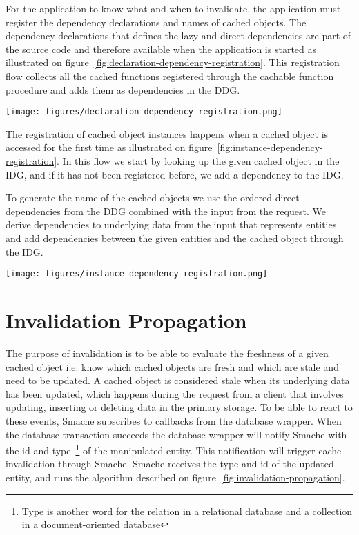 For the application to know what and when to invalidate, the application must register the dependency declarations and names of cached objects. The dependency declarations that defines the lazy and direct dependencies are part of the source code and therefore available when the application is started as illustrated on figure~\ref{fig:declaration-dependency-registration}. This registration flow collects all the cached functions registered through the cachable function procedure and adds them as dependencies in the DDG.

\begin{figure*}[ht!]
  \centering
  \texttt{[image: figures/declaration-dependency-registration.png]}
  \caption{The flow in which lazy and direct dependencies are registered from the declarations}
  \label{fig:declaration-dependency-registration}
\end{figure*}

The registration of cached object instances happens when a cached object is accessed for the first time as illustrated on figure~\ref{fig:instance-dependency-registration}. In this flow we start by looking up the given cached object in the IDG, and if it has not been registered before, we add a dependency to the IDG.

To generate the name of the cached objects we use the ordered direct dependencies from the DDG combined with the input from the request. We derive dependencies to underlying data from the input that represents entities and add dependencies between the given entities and the cached object through the IDG.

\begin{figure*}[ht!]
  \centering
  \texttt{[image: figures/instance-dependency-registration.png]}
  \caption{The flow in which cached object instances are accessed when they are accessed the first time}
  \label{fig:instance-dependency-registration}
\end{figure*}

\section{Invalidation Propagation}
\label{sec:invalidation-propagation}

The purpose of invalidation is to be able to evaluate the freshness of a given cached object i.e. know which cached objects are fresh and which are stale and need to be updated. A cached object is considered stale when its underlying data has been updated, which happens during the request from a client that involves updating, inserting or deleting data in the primary storage. To be able to react to these events, Smache subscribes to callbacks from the database wrapper. When the database transaction succeeds the database wrapper will notify Smache with the id and type~\footnote{Type is another word for the relation in a relational database and a collection in a document-oriented database} of the manipulated entity. This notification will trigger cache invalidation through Smache. Smache receives the type and id of the updated entity, and runs the algorithm described on figure~\ref{fig:invalidation-propagation}.

